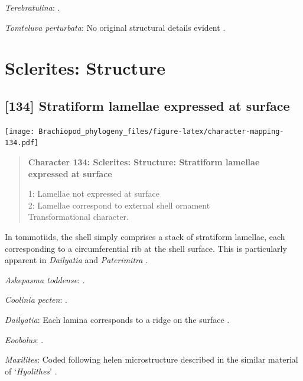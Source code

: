 \documentclass[openany]{book}
\begin{document}
\hypertarget{Terebratulina-coding-133}{}
\emph{Terebratulina}: \citet{Parkinson2005}.

\hypertarget{Tomteluva_perturbata-coding-133}{}
\emph{Tomteluva perturbata}: No original structural details evident
\citep{Streng2016Anew}.

\section{Sclerites: Structure}\label{sclerites-structure}

\subsection*{{[}134{]} Stratiform lamellae expressed at
surface}\label{stratiform-lamellae-expressed-at-surface}

\texttt{[image: Brachiopod\_phylogeny\_files/figure-latex/character-mapping-134.pdf]}

\begin{quote}
\textbf{Character 134: Sclerites: Structure: Stratiform lamellae
expressed at surface}

1: Lamellae not expressed at surface\\
2: Lamellae correspond to external shell ornament\\
Transformational character.
\end{quote}

In tommotiids, the shell simply comprises a stack of stratiform
lamellae, each corresponding to a circumferential rib at the shell
surface. This is particularly apparent in \emph{Dailyatia}
\citep{Skovsted2015Theearly} and \emph{Paterimitra}
\citep{Larsson2014iPaterimitra}.

\hypertarget{Askepasma_toddense-coding-134}{}
\emph{Askepasma toddense}: \citet{Topper2013Theoldest}.

\hypertarget{Coolinia_pecten-coding-134}{}
\emph{Coolinia pecten}: \citet{Dewing2004}.

\hypertarget{Dailyatia-coding-134}{}
\emph{Dailyatia}: Each lamina corresponds to a ridge on the surface
\citep{Skovsted2015Theearly}.

\hypertarget{Eoobolus-coding-134}{}
\emph{Eoobolus}: \citet{Balthasar2007Anearly}.

\hypertarget{Maxilites-coding-134}{}
\emph{Maxilites}: Coded following helen microstructure described in the
similar material of `\emph{Hyolithes}' \citep{MartiMus2007}.
\end{document}
